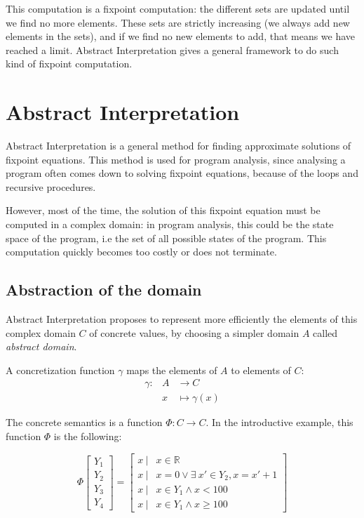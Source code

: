\documentclass[a4paper,english,titlepage,11pt]{report}
\def\R{\mathbb{R}}
\begin{document}
This computation is a fixpoint computation: the different sets are updated until
we find no more elements. These sets are strictly increasing (we always add new
elements in the sets), and if we find no new elements to add, that means we have
reached a limit. Abstract Interpretation gives a general framework to do such
kind of fixpoint computation.


\section{Abstract Interpretation}

Abstract Interpretation \cite{CC77,CousotCousot92-1} is a general method for
finding approximate solutions of
fixpoint equations. This method is used for program analysis, since analysing a
program often comes down to solving fixpoint equations, because of the loops and
recursive procedures.

However, most of the time, the solution of this fixpoint equation must be
computed in a complex domain: in program analysis, this could be the state space
of the program, i.e the set of all possible states of the program. This
computation quickly becomes too costly or does not terminate.

\subsection{Abstraction of the domain}

Abstract Interpretation proposes to represent more efficiently the
elements of this complex domain $C$ of concrete values,
by choosing a simpler domain  $A$ called \emph{abstract domain}. 

A concretization function $\gamma$ maps the elements of $A$ to elements of $C$:
\begin{eqnarray*}
\gamma: & A &\longrightarrow C \\
		& x &\longmapsto \gamma(x)
\end{eqnarray*}

The concrete semantics is a function $\Phi: C \rightarrow C$.
In the introductive example, this function $\Phi$ is the following:


$$\Phi\left[ \begin{array}{c}
Y_1 \\
Y_2 \\
Y_3 \\
Y_4
\end{array} \right] = \left[ \begin{array}{cc} 
x\ |& x \in \R \\
x\ |& x = 0 \vee \exists\  x'\in Y_2, x = x'+1 \\
x\ |& x \in Y_1 \wedge x < 100 \\
x\ |& x \in Y_1 \wedge x \geq 100 
\end{array} \right]$$
\end{document}
